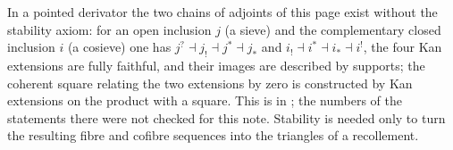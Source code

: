 In a pointed derivator the two chains of adjoints of this page exist without the stability axiom: for an open inclusion $j$ (a sieve) and the complementary closed inclusion $i$ (a cosieve) one has $j^?\dashv j_!\dashv j^*\dashv j_*$ and $i_!\dashv i^*\dashv i_*\dashv i^!$, the four Kan extensions are fully faithful, and their images are described by supports; the coherent square relating the two extensions by zero is constructed by Kan extensions on the product with a square. This is in \citet{Groth2013}; the numbers of the statements there were not checked for this note. Stability is needed only to turn the resulting fibre and cofibre sequences into the triangles of a recollement.

